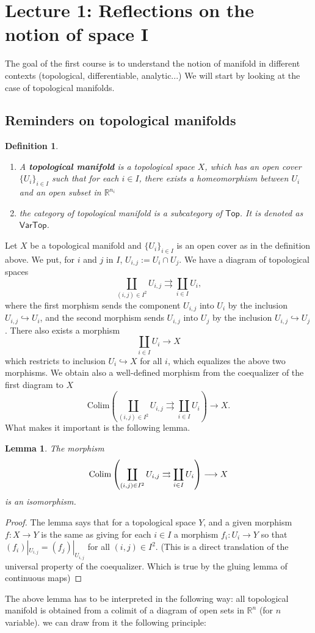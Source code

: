 \documentclass{tufte-book} %
\numberwithin{dummy}{section}
\newtheorem{lemma}[thm]{Lemma}
\newtheorem{dfn}[thm]{Definition}
\newcommand{\reals}{\mathbb R}
\newcommand{\lrta}{\longrightarrow}
\newcommand{\inj}{\hookrightarrow}
\begin{document}
\section{Lecture 1: Reflections on the notion of space I}
The goal of the first course is to understand the notion of manifold in different contexts (topological, differentiable, analytic...) We will start by looking at the case of topological manifolds.
\subsection*{Reminders on topological manifolds}
\begin{dfn}
\begin{enumerate}
  \item A \textbf{topological manifold} is a topological space $X$, which has an open cover $\{U_i\}_{i\in I}$ such that for each $i\in I$, there exists a homeomorphism between $U_i$ and an open subset in $\reals^{n_i}$ 

  \item the category of topological manifold is a subcategory of $\mathsf{Top}$. It is denoted as $\mathsf{VarTop}$. 
\end{enumerate}
\end{dfn}

Let $X$ be a topological manifold and $\{U_i\}_{i\in I}$ is an open cover as in the definition above. We put, for $i$ and $j$ in $I$, $U_{i,j}:=U_i\cap U_j$. We have a diagram of topological spaces
$$
\coprod_{(i,j)\in I^2}U_{i,j}\rightrightarrows \coprod_{i\in I} U_{i},
$$
where the first morphism sends the component $U_{i,j}$ into $U_i$ by the inclusion $U_{i,j}\inj U_i$, and the second morphism sends $U_{i,j}$ into $U_j$ by the inclusion $U_{i,j}\inj U_j$. There also exists  a morphism
$$
\coprod_{i\in I} U_i\lrta X
$$
which restricts to inclusion $U_i\inj X$ for all $i$, which equalizes the above two morphisms. We obtain also a well-defined morphism from the coequalizer of the first diagram to $X$
$$
\text{Colim}\left(\coprod_{(i,j)\in I^2}U_{i,j}\rightrightarrows \coprod_{i\in I}U_i\right)\lrta X.
$$
What makes it important is the following lemma.
\begin{lemma}
The morphism 
$$
\textnormal{Colim}\left(\coprod_{(i,j)\in I^2}U_{i,j}\rightrightarrows \coprod_{i\in I}U_i\right)\lrta X
$$
is an isomorphism.
\end{lemma}
\begin{proof}
The lemma says that for a topological space $Y$, and a given morphism $f:X\lrta Y$ is the same as giving for each $i\in I$ a morphism $f_i:U_i\lrta Y$ so that $(f_i)|_{U_{i,j}}=(f_j)|_{U_{i,j}}$ for all $(i,j)\in I^2$. (This is a direct translation of the universal property of the coequalizer. Which is true by the gluing lemma of continuous maps)
\end{proof}
The above lemma has to be interpreted in the following way: all topological manifold is obtained from a colimit of a diagram of open sets in $\reals^n$ (for $n$ variable). we can draw from it the following principle:
\end{document}
